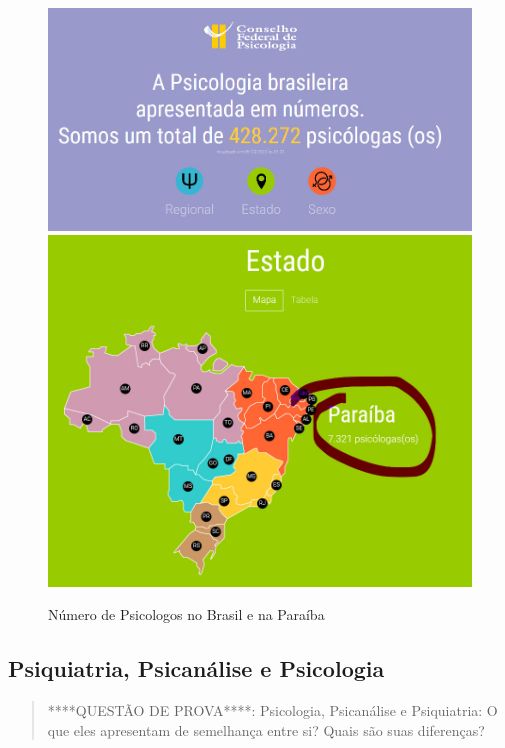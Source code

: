 \documentclass[
]{book}
\begin{document}
\begin{figure}

{\centering \includegraphics[width=0.5\linewidth]{imagens/numero-de-psicologos-no-brasil} \includegraphics[width=0.5\linewidth]{imagens/numeros-de-psicologia-na-paraiba} 

}

\caption{Número de Psicologos no Brasil e na Paraíba}\label{fig:unnamed-chunk-2}
\end{figure}

\hypertarget{psiquiatria-psicanuxe1lise-e-psicologia}{%
\subsection{Psiquiatria, Psicanálise e Psicologia}\label{psiquiatria-psicanuxe1lise-e-psicologia}}

\begin{quote}
****QUESTÃO DE PROVA****: Psicologia, Psicanálise e Psiquiatria: O que eles apresentam
de semelhança entre si? Quais são suas diferenças?
\end{quote}
\end{document}

